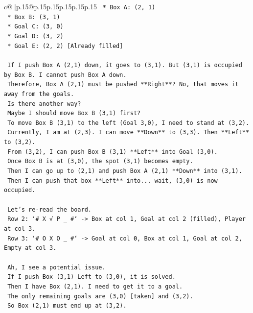 \documentclass{article}
\begin{document}
{\begin{supertabular}{c@{$\;$}|p{.15\linewidth}@{}p{.15\linewidth}p{.15\linewidth}p{.15\linewidth}p{.15\linewidth}p{.15\linewidth}}
{{{\texttt{    *   Box A: (2, 1)} \\
\texttt{    *   Box B: (3, 1)} \\
\texttt{    *   Goal C: (3, 0)} \\
\texttt{    *   Goal D: (3, 2)} \\
\texttt{    *   Goal E: (2, 2) {[}Already filled{]}} \\
\\ 
\texttt{    If I push Box A (2,1) down, it goes to (3,1). But (3,1) is occupied by Box B. I cannot push Box A down.} \\
\texttt{    Therefore, Box A (2,1) must be pushed **Right**? No, that moves it away from the goals.} \\
\texttt{    Is there another way?} \\
\texttt{    Maybe I should move Box B (3,1) first?} \\
\texttt{    To move Box B (3,1) to the left (Goal 3,0), I need to stand at (3,2).} \\
\texttt{    Currently, I am at (2,3). I can move **Down** to (3,3). Then **Left** to (3,2).} \\
\texttt{    From (3,2), I can push Box B (3,1) **Left** into Goal (3,0).} \\
\texttt{    Once Box B is at (3,0), the spot (3,1) becomes empty.} \\
\texttt{    Then I can go up to (2,1) and push Box A (2,1) **Down** into (3,1).} \\
\texttt{    Then I can push that box **Left** into... wait, (3,0) is now occupied.} \\
\\ 
\texttt{    Let's re{-}read the board.} \\
\texttt{    Row 2: `\# X √ P \_ \#` {-}> Box at col 1, Goal at col 2 (filled), Player at col 3.} \\
\texttt{    Row 3: `\# O X O \_ \#` {-}> Goal at col 0, Box at col 1, Goal at col 2, Empty at col 3.} \\
\\ 
\texttt{    Ah, I see a potential issue.} \\
\texttt{    If I push Box (3,1) Left to (3,0), it is solved.} \\
\texttt{    Then I have Box (2,1). I need to get it to a goal.} \\
\texttt{    The only remaining goals are (3,0) {[}taken{]} and (3,2).} \\
\texttt{    So Box (2,1) must end up at (3,2).} \\
}}}
\end{supertabular}}
\end{document}
